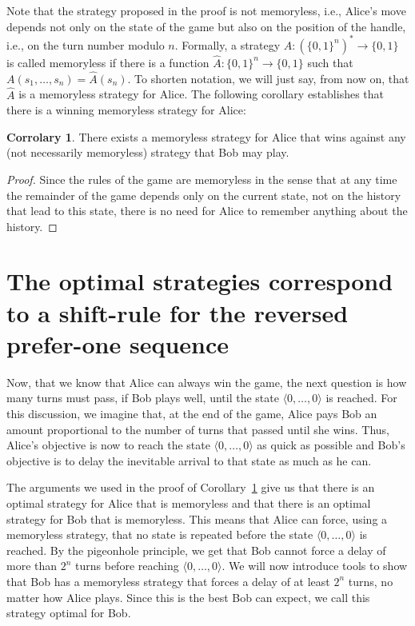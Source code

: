\documentclass[final,12pt]{elsarticle}
\theoremstyle{definition} \newtheorem{definition}[theorem]{Definition} \newtheorem{observation}[theorem]{Observation} \newtheorem{example}[theorem]{Example} \newtheorem{remark}[theorem]{Remark} \newtheorem{corrolary}[theorem]{Corrolary}
\newcommand{\T}[1]{\langle{#1}\rangle} \DeclareMathOperator{\drop}{drop} \DeclareMathOperator{\dropbits}{drop\_bits} \DeclareMathOperator{\dropstates}{drop\_states} \DeclareMathOperator{\leadingForm}{LeadingForm} \DeclareMathOperator{\dv}{div} %
\begin{document}
Note that the strategy proposed in the proof is not memoryless, i.e., Alice's move depends not only on the state of the game but also on the position of the handle, i.e., on the turn number modulo $n$. Formally, a strategy $A \colon(\{0,1\}^n)^* \to \{0,1\}$ is called memoryless if there is a function $ \hat{A} \colon \{0,1\}^n \to\{0,1\}$ such that $A(s_1,\dots,s_n)= \hat{A}(s_n)$. To shorten notation, we will just say, from now on, that $ \hat{A}$ is a memoryless strategy for Alice. The following corollary establishes that there is a winning memoryless strategy for Alice:

\begin{corrolary}
	There exists a memoryless strategy for Alice that wins against any (not necessarily memoryless) strategy that Bob may play.
	\label{cor:memoryless}
\end{corrolary}
\begin{proof}
	Since the rules of the game are memoryless in the sense that at any time the remainder of the game depends only on the current state, not on the history that lead to this state, there is no need for Alice to remember anything about the history. 
\end{proof}

\section{The optimal strategies correspond to a shift-rule for the reversed prefer-one sequence}
\label{sec:optimal-strategies}

Now, that we know that Alice can always win the game, the next question is how many turns must pass, if Bob plays well, until the state $ \T{0,\dots,0}$ is reached. For this discussion, we imagine that, at the end of the game, Alice pays Bob an amount proportional to the number of turns that passed until she wins. Thus, Alice's objective is now to reach the state $\T{0,\dots,0}$ as quick as possible and Bob's objective is to delay the inevitable arrival to that state as much as he can. 

The arguments we used in the proof of Corollary~\ref{cor:memoryless} give us that there is an optimal strategy for Alice that is memoryless and that there is an optimal strategy for Bob that is memoryless. This means that Alice can force, using a memoryless strategy, that no state is repeated before the state $\T{0,\dots,0}$ is reached. By the pigeonhole principle, we get that Bob cannot force a delay of more than $2^n$ turns before reaching $ \T{0,\dots,0}$. We will now introduce tools to show that Bob has a memoryless strategy that forces a delay of at least $2^n$ turns, no matter how Alice plays. Since this is the best Bob can expect, we call this strategy optimal for Bob. 
\end{document}
